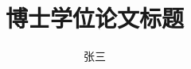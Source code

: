 \documentclass[degree=phd]{nwputhesis}
\title{博士学位论文标题}{Doctoral Thesis Title}
\author{张三}{San Zhang}
\begin{document}
\START
\showoutput

\maketitle

\clearpage
\OMIT
\end{document}
